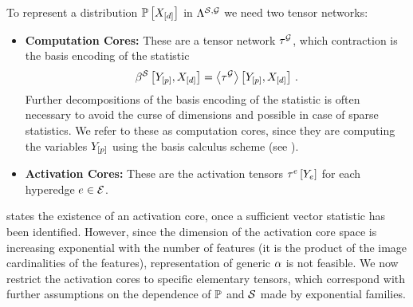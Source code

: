 To represent a distribution $\mathbb{P}\left[X_{[d]}\right]$ in $\Lambda^{\mathcal{S},\mathcal{G}}$ we need two tensor networks:
\begin{itemize}
    \item \textbf{Computation Cores:} These are a tensor network $\tau^{\mathcal{G}}$, which contraction is the basis encoding of the statistic
    \begin{align*}
        \beta^{\mathcal{S}}\left[Y_{[p]},X_{[d]}\right] = \left\langle \tau^{\mathcal{G}}\right\rangle \left[ Y_{[p]},X_{[d]} \right] \, .
    \end{align*}
    Further decompositions of the basis encoding of the statistic is often necessary to avoid the curse of dimensions and possible in case of sparse statistics.
    We refer to these as computation cores, since they are computing the variables $Y_{[p]}$ using the basis calculus scheme (see ).
    \item \textbf{Activation Cores:} These are the activation tensors $\tau^{e}\left[Y_{e}\right]$ for each hyperedge $e\in\mathcal{E}$.
\end{itemize}


\label{sec:exponentialFamilies}

 states the existence of an activation core, once a sufficient vector statistic has been identified.
However, since the dimension of the activation core space is increasing exponential with the number of features (it is the product of the image cardinalities of the features), representation of generic $\alpha$ is not feasible.
We now restrict the activation cores to specific elementary tensors, which correspond with further assumptions on the dependence of $\mathbb{P}$ and $\mathcal{S}$ made by exponential families.


